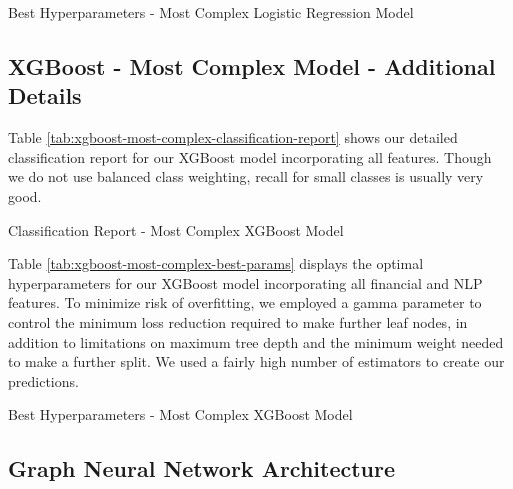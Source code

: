 \documentclass{article}[11pt]
\begin{document}
    \begin{table}[h!]
        \centering
        \caption{Best Hyperparameters - Most Complex Logistic Regression Model}
        
        \label{tab:logistic-most-complex-best-params}
    \end{table}

    \clearpage
    \newpage

    \subsection{XGBoost - Most Complex Model - Additional Details}

    \label{sec:xgboost-most-complex-model-additional-details}

    Table \ref{tab:xgboost-most-complex-classification-report} shows our detailed classification report for our XGBoost model incorporating all features. Though we do not use balanced class weighting, recall for small classes is usually very good.

    \begin{table}[h!]
        \centering
        \caption{Classification Report - Most Complex XGBoost Model}
        
        \label{tab:xgboost-most-complex-classification-report}
    \end{table}

    Table \ref{tab:xgboost-most-complex-best-params} displays the optimal hyperparameters for our XGBoost model incorporating all financial and NLP features. To minimize risk of overfitting, we employed a gamma parameter to control the minimum loss reduction required to make further leaf nodes, in addition to limitations on maximum tree depth and the minimum weight needed to make a further split. We used a fairly high number of estimators to create our predictions.

    \begin{table}[h!]
        \centering
        \caption{Best Hyperparameters - Most Complex XGBoost Model}
        
        \label{tab:xgboost-most-complex-best-params}
    \end{table}

    \clearpage
    \newpage

    \subsection{Graph Neural Network Architecture}
\end{document}
